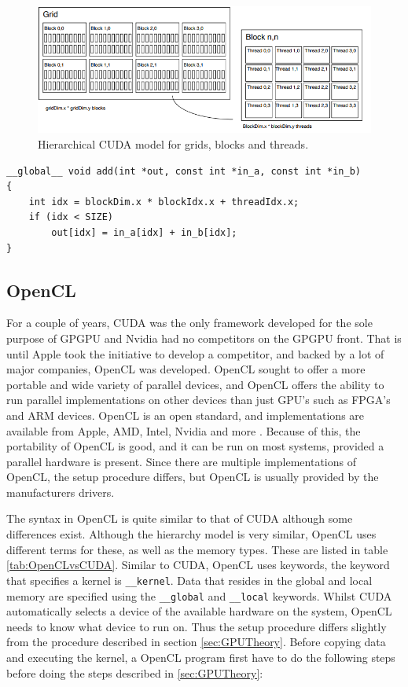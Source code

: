 \begin{figure}[!htpb]
    \centering
    \includegraphics[width=\textwidth]{Theory/Figs/CUDAGridBlockThreads.png}
    \caption{Hierarchical CUDA model for grids, blocks and threads.}
    \label{fig:CUDAGridBlockThreads}
\end{figure}

\begin{lstlisting}[caption={CUDA vector addition kernel}, label={lst:cudaVectorAdd}, frame=single] 
__global__ void add(int *out, const int *in_a, const int *in_b)
{
	int idx = blockDim.x * blockIdx.x + threadIdx.x;
	if (idx < SIZE)
		out[idx] = in_a[idx] + in_b[idx];
}
\end{lstlisting}



\subsection{OpenCL} \label{sec:OpenCLTheory}
For a couple of years, CUDA was the only framework developed for the sole purpose of GPGPU and Nvidia had no competitors on the GPGPU front. That is until Apple took the initiative to develop a competitor, and backed by a lot of major companies, OpenCL was developed. OpenCL sought to offer a more portable and wide variety of parallel devices, and OpenCL offers the ability to run parallel implementations on other devices than just GPU's such as FPGA's and ARM devices. OpenCL is an open standard, and implementations are available from Apple, AMD, Intel, Nvidia and more \cite{KhronosOpenCL}. Because of this, the portability of OpenCL is good, and it can be run on most systems, provided a parallel hardware is present. Since there are multiple implementations of OpenCL, the setup procedure differs, but OpenCL is usually provided by the manufacturers drivers.

The syntax in OpenCL is quite similar to that of CUDA although some differences exist. Although the hierarchy model is very similar, OpenCL uses different terms for these, as well as the memory types. These are listed in table \ref{tab:OpenCLvsCUDA}. Similar to CUDA, OpenCL uses keywords, the keyword that specifies a kernel is \lstinline{__kernel}. Data that resides in the global and local memory are specified using the \lstinline{__global} and \lstinline{__local} keywords.
Whilst CUDA automatically selects a device of the available hardware on the system, OpenCL needs to know what device to run on. Thus the setup procedure differs slightly from the procedure described in section \ref{sec:GPUTheory}. Before copying data and executing the kernel, a OpenCL program first have to do the following steps before doing the steps described in \ref{sec:GPUTheory}:

